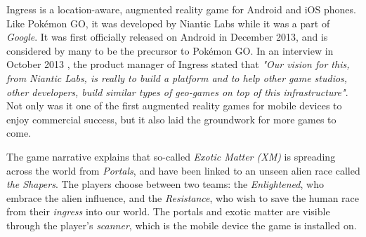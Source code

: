 Ingress is a location-aware, augmented reality game for Android and iOS phones. Like Pokémon GO, it was developed by Niantic Labs while it was a part of \emph{Google}. It was first officially released on Android in December 2013, and is considered by many to be the precursor to Pokémon GO. In an interview in October 2013 \cite{gamasutraBadger}, the product manager of Ingress stated that \emph{"Our vision for this, from Niantic Labs, is really to build a platform and to help other game studios, other developers, build similar types of geo-games on top of this infrastructure"}. Not only was it one of the first augmented reality games for mobile devices to enjoy commercial success, but it also laid the groundwork for more games to come.

The game narrative explains that so-called \emph{Exotic Matter (XM)} is spreading across the world from \emph{Portals}, and have been linked to an unseen alien race called \emph{the Shapers}. The players choose between two teams: the \emph{Enlightened}, who embrace the alien influence, and the \emph{Resistance}, who wish to save the human race from their \emph{ingress} into our world. The portals and exotic matter are visible through the player's \emph{scanner}, which is the mobile device the game is installed on.

